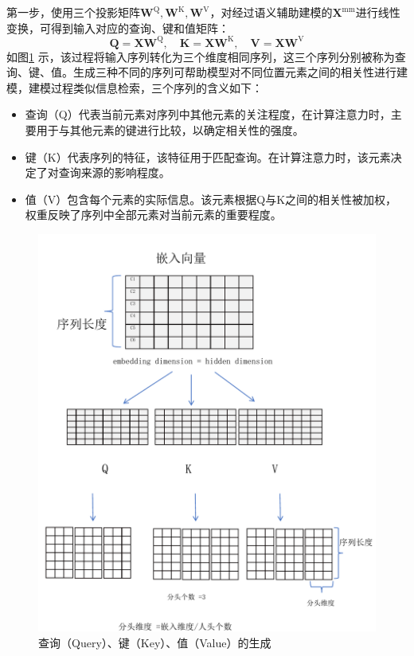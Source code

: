 第一步，使用三个投影矩阵$\mathbf{W}^{\mathrm{Q}} ,\mathbf{W}^{\mathrm{K}},\mathbf{W}^{\mathrm{V}}$，对经过语义辅助建模的$ \mathbf{X}^{\mathrm{mm}}$进行线性变换，可得到输入对应的查询、键和值矩阵：
\begin{equation}
\mathbf{Q} = \mathbf{X}\mathbf{W}^{\mathrm{Q}}, \quad \mathbf{K} = \mathbf{X}\mathbf{W}^{\mathrm{K}}, \quad \mathbf{V} = \mathbf{X}\mathbf{W}^{\mathrm{V}}
\end{equation}
如图\ref{fig:attention_proj} 示，该过程将输入序列转化为三个维度相同序列，这三个序列分别被称为查询、键、值。生成三种不同的序列可帮助模型对不同位置元素之间的相关性进行建模，建模过程类似信息检索，三个序列的含义如下：
\begin{itemize}
    \item 查询（Q）代表当前元素对序列中其他元素的关注程度，在计算注意力时，主要用于与其他元素的键进行比较，以确定相关性的强度。
    \item 键（K）代表序列的特征，该特征用于匹配查询。在计算注意力时，该元素决定了对查询来源的影响程度。
    \item 值（V）包含每个元素的实际信息。该元素根据Q与K之间的相关性被加权，权重反映了序列中全部元素对当前元素的重要程度。
\end{itemize}

\begin{figure}[htbp]
    \centering
    \includegraphics[width=0.85\linewidth]{img/multimodal/attention_proj.pdf}
    \caption{查询（Query）、键（Key）、值（Value）的生成}
    \label{fig:attention_proj}
\end{figure}

